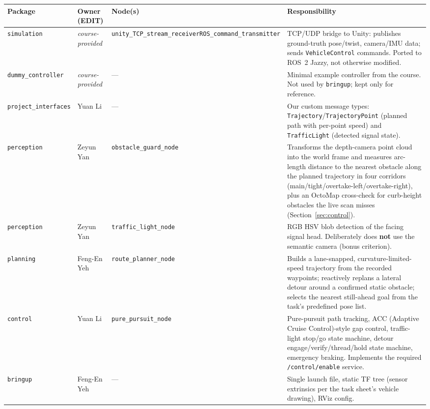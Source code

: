 \documentclass[10pt,twocolumn]{article}
\begin{document}
\begin{table}[t]
\footnotesize
\begin{tabularx}{\textwidth}{@{}>{\raggedright\arraybackslash}p{2.6cm} >{\raggedright\arraybackslash}p{1.7cm} >{\raggedright\arraybackslash}p{3.7cm} X@{}}
\toprule
\textbf{Package} & \textbf{Owner (EDIT)} & \textbf{Node(s)} & \textbf{Responsibility} \\
\midrule
\texttt{simulation} & \emph{course-provided} & \texttt{unity\_TCP\_stream\_receiver}\newline\texttt{ROS\_command\_transmitter} & TCP/UDP bridge to Unity: publishes ground-truth pose/twist, camera/IMU data; sends \texttt{VehicleControl} commands. Ported to ROS~2 Jazzy, not otherwise modified. \\
\texttt{dummy\_controller} & \emph{course-provided} & --- & Minimal example controller from the course. Not used by \texttt{bringup}; kept only for reference. \\
\texttt{project\_interfaces} & Yuan Li & --- & Our custom message types: \texttt{Trajectory}/\texttt{TrajectoryPoint} (planned path with per-point speed) and \texttt{TrafficLight} (detected signal state). \\
\texttt{perception} & Zeyun Yan & \texttt{obstacle\_guard\_node} & Transforms the depth-camera point cloud into the world frame and measures arc-length distance to the nearest obstacle along the planned trajectory in four corridors (main/tight/overtake-left/overtake-right), plus an OctoMap cross-check for curb-height obstacles the live scan misses (Section~\ref{sec:control}). \\
\texttt{perception} & Zeyun Yan & \texttt{traffic\_light\_node} & RGB HSV blob detection of the facing signal head. Deliberately does \textbf{not} use the semantic camera (bonus criterion). \\
\texttt{planning} & Feng-En Yeh & \texttt{route\_planner\_node} & Builds a lane-snapped, curvature-limited-speed trajectory from the recorded waypoints; reactively replans a lateral detour around a confirmed static obstacle; selects the nearest still-ahead goal from the task's predefined pose list. \\
\texttt{control} & Yuan Li & \texttt{pure\_pursuit\_node} & Pure-pursuit path tracking, ACC (Adaptive Cruise Control)-style gap control, traffic-light stop/go state machine, detour engage/verify/thread/hold state machine, emergency braking. Implements the required \texttt{/control/enable} service. \\
\texttt{bringup} & Feng-En Yeh & --- & Single launch file, static TF tree (sensor extrinsics per the task sheet's vehicle drawing), RViz config. \\
\bottomrule
\end{tabularx}
\end{table}
\end{document}
